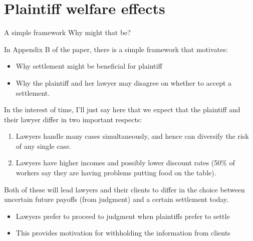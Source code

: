 \documentclass[9pt]{beamer}
\begin{document}
\section{Plaintiff welfare effects}
\begin{frame}{A simple framework}
Why might that be?
\vspace{.1in}

    In Appendix B of the paper, there is a simple framework that motivates:
    \begin{itemize}
        \item Why settlement might be beneficial for plaintiff
        \item Why the plaintiff and her lawyer may disagree on whether to accept a settlement.
    \end{itemize}
    
    \pause
    \vspace{.1in}
    In the interest of time, I'll just say here that we expect that the plaintiff and their lawyer differ in two important respects:
    \begin{enumerate}
        \item Lawyers handle many cases simultaneously, and hence can diversify the risk of any single case.
        \item Lawyers have higher incomes and possibly lower discount rates (50\% of workers say they are having problems putting food on the table).
    \end{enumerate}
    \vspace{3mm}
    
    \pause
    
    Both of these will lead lawyers and their clients to differ in the \alert{choice between uncertain future payoffs} (from judgment) and a \alert{certain settlement today}.
    \begin{itemize}
        \item Lawyers prefer to proceed to judgment when plaintiffs prefer to settle
        \item This provides motivation for withholding the information from clients
    \end{itemize}
\end{frame}
\end{document}
